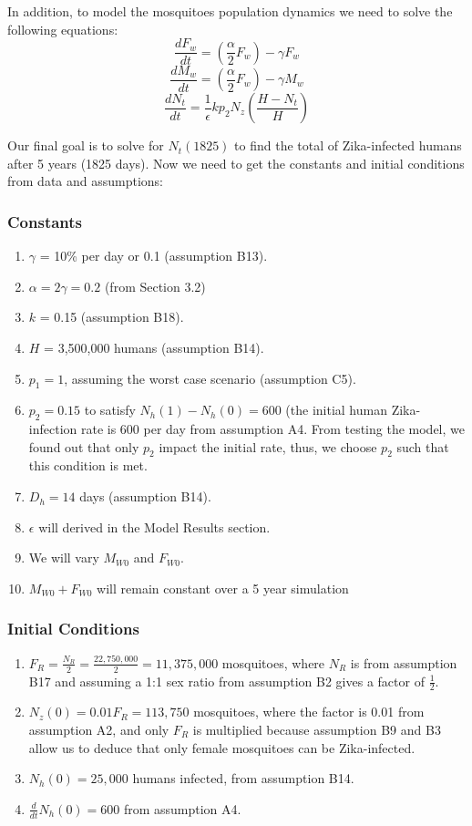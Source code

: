 \documentclass{article}
\begin{document}
In addition, to model the mosquitoes population dynamics we need to solve the following equations:
\begin{equation}
    \frac{dF_w}{dt} = (\frac{\alpha}{2}F_w)-\gamma F_w
\end{equation}
\begin{equation}
    \frac{dM_w}{dt} = (\frac{\alpha}{2}F_w)-\gamma M_w
\end{equation}
\begin{equation}
    \frac{dN_t}{dt} = \frac{1}{\epsilon}kp_2N_z (\frac{H-N_t}{H})
\end{equation}

Our final goal is to solve for $N_t(1825)$ to find the total of Zika-infected humans after 5 years (1825 days). Now we need to get the constants and initial conditions from data and assumptions:
\subsubsection{Constants}
\begin{enumerate}
    \item $\gamma$ = 10\% per day or 0.1 (assumption B13).
    \item $\alpha = 2\gamma = 0.2$  (from Section 3.2)
    \item $k$ = 0.15 (assumption B18).
    \item $H$ = 3,500,000 humans (assumption B14).
    \item $p_1 = 1$, assuming the worst case scenario (assumption C5).
    \item $p_2 = 0.15$ to satisfy $N_h(1)-N_h(0)=600$ (the initial human Zika-infection rate is 600 per day from assumption A4. From testing the model, we found out that only $p_2$ impact the initial rate, thus, we choose $p_2$ such that this condition is met.
    \item $D_h = 14$ days (assumption B14).
    \item $\epsilon$ will derived in the Model Results section.
    \item We will vary $M_{W0}$ and $F_{W0}$.
    \item $M_{W0} + F_{W0}$ will remain constant over a 5 year simulation
\end{enumerate}
\subsubsection{Initial Conditions}
\begin{enumerate}
    \item $F_R = \frac{N_R}{2} = \frac{22,750,000}{2} = 11,375,000$ mosquitoes, where $N_R$ is from assumption B17 and assuming a 1:1 sex ratio from assumption B2 gives a factor of $\frac{1}{2}$.
    \item $N_z(0) = 0.01F_R = 113,750$ mosquitoes, where the factor is 0.01 from assumption A2, and only $F_R$ is multiplied because assumption B9 and B3 allow us to deduce that only female mosquitoes can be Zika-infected.
    \item $N_h(0) = 25,000$ humans infected, from assumption B14.
    \item $\frac{d}{dt}N_h(0) = 600$ from assumption A4.
\end{enumerate}
\end{document}
